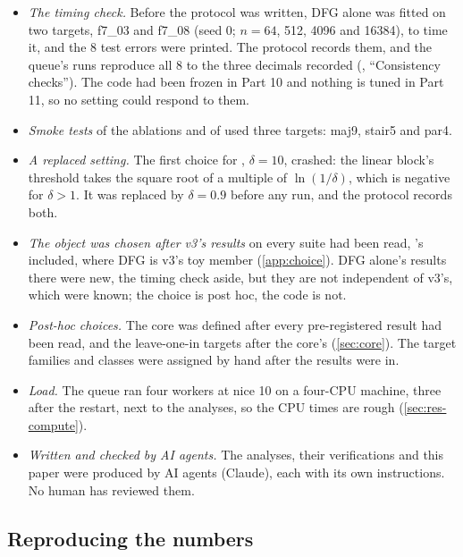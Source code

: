 \begin{itemize}
\item \emph{The timing check.} Before the protocol was written, DFG alone was fitted on two  targets, f7\_03 and f7\_08 (seed 0; $n=64$, 512, 4096 and 16384), to time it, and the 8 test errors were printed. The protocol records them, and the queue's runs reproduce all 8 to the three decimals recorded (, ``Consistency checks''). The code had been frozen in Part 10 and nothing is tuned in Part 11, so no setting could respond to them.
\item \emph{Smoke tests} of the ablations and of  used three  targets: maj9, stair5 and par4.
\item \emph{A replaced setting.} The first choice for , $\delta=10$, crashed: the linear block's threshold takes the square root of a multiple of $\ln(1/\delta)$, which is negative for $\delta>1$. It was replaced by $\delta=0.9$ before any run, and the protocol records both.
\item \emph{The object was chosen after v3's results} on every suite had been read, 's included, where DFG is v3's toy member (\cref{app:choice}). DFG alone's results there were new, the timing check aside, but they are not independent of v3's, which were known; the choice is post hoc, the code is not.
\item \emph{Post-hoc choices.} The core was defined after every pre-registered result had been read, and the leave-one-in targets after the core's (\cref{sec:core}). The target families and classes were assigned by hand after the results were in.
\item \emph{Load.} The queue ran four workers at nice 10 on a four-CPU machine, three after the restart, next to the analyses, so the CPU times are rough (\cref{sec:res-compute}).
\item \emph{Written and checked by AI agents.} The analyses, their verifications and this paper were produced by AI agents (Claude), each with its own instructions. No human has reviewed them.
\end{itemize}

\subsection{Reproducing the numbers}\label{app:repro}

